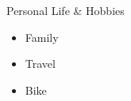 \begin{frame}{Personal Life \& Hobbies}
%
  \begin{itemize}\itemfill
    \item Family
    \item Travel
    \item Bike
  \end{itemize}
%
\end{frame}
